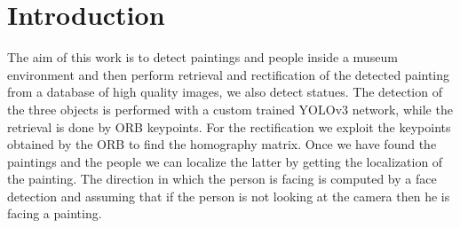 \section{Introduction}
The aim of this work is to detect paintings and people inside a museum environment and then perform retrieval and rectification of the detected painting from a database of high quality images, we also detect statues. The detection of the three objects is performed with a custom trained YOLOv3 network, while the retrieval is done by ORB keypoints. For the rectification we exploit the keypoints obtained by the ORB to find the homography matrix. Once we have found the paintings and the people we can localize the latter by getting the localization of the painting. The direction in which the person is facing is computed by a face detection and assuming that if the person is not looking at the camera then he is facing a painting.
